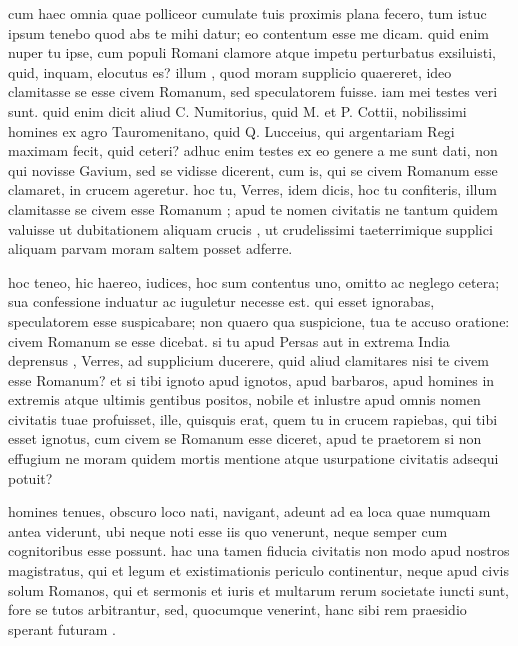  cum haec omnia quae polliceor cumulate tuis proximis plana fecero, tum istuc ipsum tenebo quod abs te mihi datur; eo contentum esse me dicam. quid enim nuper tu ipse, cum populi Romani clamore atque impetu perturbatus exsiluisti, quid, inquam, elocutus es? illum , quod moram supplicio quaereret, ideo clamitasse se esse civem Romanum, sed speculatorem fuisse. iam mei testes veri sunt. quid enim dicit aliud C. Numitorius, quid M. et P. Cottii, nobilissimi homines ex agro Tauromenitano, quid Q. Lucceius, qui argentariam Regi maximam fecit, quid ceteri? adhuc enim testes ex eo genere a me sunt dati, non qui novisse Gavium, sed se vidisse dicerent, cum is, qui se civem Romanum esse clamaret, in crucem ageretur. hoc tu, Verres, idem dicis, hoc tu confiteris, illum clamitasse se civem esse Romanum ; apud te nomen civitatis ne tantum quidem valuisse ut dubitationem aliquam crucis , ut crudelissimi taeterrimique supplici aliquam parvam moram saltem posset adferre.

 hoc teneo, hic haereo, iudices, hoc sum contentus uno, omitto ac neglego cetera; sua confessione induatur ac iuguletur necesse est. qui esset ignorabas, speculatorem esse suspicabare; non quaero qua suspicione, tua te accuso oratione: civem Romanum se esse dicebat. si tu apud Persas aut in extrema India deprensus , Verres, ad supplicium ducerere, quid aliud clamitares nisi te civem esse Romanum? et si tibi ignoto apud ignotos, apud barbaros, apud homines in extremis atque ultimis gentibus positos, nobile et inlustre apud omnis nomen civitatis tuae profuisset, ille, quisquis erat, quem tu in crucem rapiebas, qui tibi esset ignotus, cum civem se Romanum esse diceret, apud te praetorem si non effugium ne moram quidem mortis mentione atque usurpatione civitatis adsequi potuit?

 homines tenues, obscuro loco nati, navigant, adeunt ad ea loca quae numquam antea viderunt, ubi neque noti esse iis quo venerunt, neque semper cum cognitoribus esse possunt. hac una tamen fiducia civitatis non modo apud nostros magistratus, qui et legum et existimationis periculo continentur, neque apud civis solum Romanos, qui et sermonis et iuris et multarum rerum societate iuncti sunt, fore se tutos arbitrantur, sed, quocumque venerint, hanc sibi rem praesidio sperant futuram .

